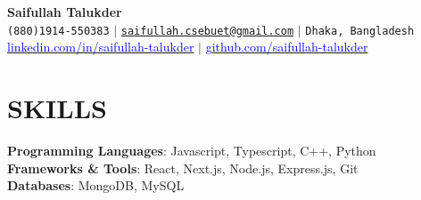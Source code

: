 \documentclass[letterpaper,10pt]{article}
\begin{document}
\begin{center}
    \textbf{\Huge Saifullah Talukder} \\ \vspace{5pt}
    \small \faPhone* \texttt{(880)1914-550383} \hspace{1pt} $|$
    \hspace{1pt} \faEnvelope \hspace{2pt} \texttt{\href{mailto:saifullah.cse16.buet@gmail.com}{saifullah.csebuet@gmail.com}} \hspace{1pt} $|$ 
    \hspace{1pt} \faMapMarker* \hspace{2pt}\texttt{Dhaka, Bangladesh}
    \\ \vspace{5pt}
    \hspace{1pt} \faLinkedin \hspace{2pt} \href{https://www.linkedin.com/in/saifullah-talukder}{\textcolor{blue}{linkedin.com/in/saifullah-talukder}} \hspace{1pt} $|$
    \hspace{1pt} \faGithub \hspace{2pt} \href{https://github.com/saifullah-talukder}{\textcolor{blue}{github.com/saifullah-talukder}} \hspace{1pt} %
    \\ \vspace{-5pt}
\end{center}

\section{SKILLS}
 \begin{itemize}[leftmargin=0in, label={}]
    \small{\item{
     \textbf{Programming Languages}: \hspace{1pt} {Javascript, Typescript, C++, Python}\vspace{2pt} \\
     \textbf{Frameworks \& Tools}: \hspace{22pt} {React, Next.js, Node.js, Express.js, Git}\vspace{2pt} \\
     \textbf{Databases}: \hspace{69pt} {MongoDB, MySQL}
    }}
 \end{itemize}
\end{document}
